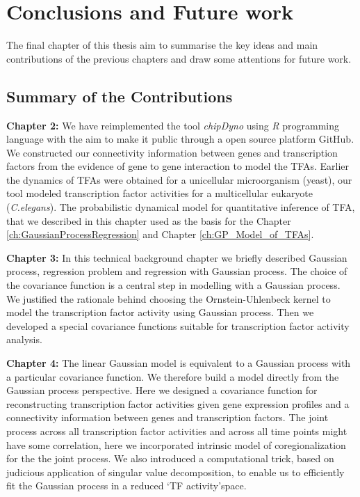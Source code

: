 
\chapter{Conclusions and Future work}

\ifpdf
    \graphicspath{{Chapter6/Figs/Raster/}{Chapter6/Figs/PDF/}{Chapter6/Figs/}}
\else
    \graphicspath{{Chapter6/Figs/Vector/}{Chapter6/Figs/}}
\fi

The final chapter of this thesis aim to summarise the key ideas and main contributions of the previous chapters and draw some attentions for future work.

\section{Summary of the Contributions}
\textbf{Chapter 2:} We have reimplemented the tool \emph{chipDyno} using \emph{R} programming language with the aim to make it public through a open source platform GitHub. We constructed our connectivity information between genes and transcription factors from the evidence of gene to gene interaction to model the TFAs. Earlier the dynamics of TFAs were obtained for a unicellular microorganism (yeast), our tool modeled transcription factor activities for a multicellular eukaryote (\textit{C.elegans}). The probabilistic dynamical model for quantitative inference of TFA, that we described in this chapter used as the basis for the  Chapter \ref{ch:GaussianProcessRegression} and Chapter \ref{ch:GP_Model_of_TFAs}.

\textbf{Chapter 3:} In this technical background chapter we briefly described Gaussian process, regression problem and regression with Gaussian process. The choice of the covariance function is a central step in modelling with a Gaussian process. We justified the rationale behind choosing the Ornstein-Uhlenbeck kernel to model the transcription factor activity using Gaussian process. Then we developed a special covariance functions suitable for transcription factor activity analysis. 

\textbf{Chapter 4:} The linear Gaussian model is equivalent to a Gaussian process with a particular covariance function. We therefore build a model directly from the Gaussian process perspective. Here we designed a covariance function for reconstructing transcription factor activities given gene expression profiles and a connectivity information between genes and transcription factors. The joint process across all transcription factor activities and across all time points might have some correlation, here we incorporated intrinsic model of coregionalization for the the joint process. We also introduced a computational trick, based on  judicious application of singular value decomposition, to enable us to efficiently fit the Gaussian process in a reduced \lq TF activity\rq space. 

